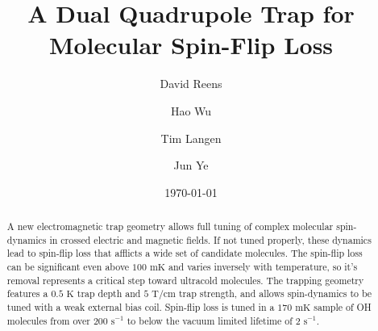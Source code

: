 \documentclass[%
 reprint,
groupedaddress,
 amsmath,amssymb,
 aps,
prl,
]{revtex4-1}
\begin{document}

\title{A Dual Quadrupole Trap for Molecular Spin-Flip Loss}%

\author{David Reens}
%
\author{Hao Wu}
\author{Tim Langen}%
\author{Jun Ye}
%

\date{\today}%


\begin{abstract}
A new electromagnetic trap geometry allows full tuning of complex molecular spin-dynamics in crossed electric and magnetic fields. If not tuned properly, these dynamics lead to spin-flip loss that afflicts a wide set of candidate molecules. The spin-flip loss can be significant even above $100\text{ mK}$ and varies inversely with temperature, so it's removal represents a critical step toward ultracold molecules. The trapping geometry features a $0.5 \text{ K}$ trap depth and $5 \text{ T/cm}$ trap strength, and allows spin-dynamics to be tuned with a weak external bias coil. Spin-flip loss is tuned in a $170 \text{ mK}$ sample of OH molecules from over $200 \text{ s}^{-1} $ to below the vacuum limited lifetime of $2 \text{ s}^{-1}$.
\end{abstract}


\maketitle
\end{document}

